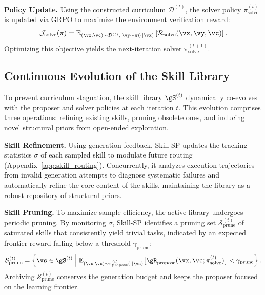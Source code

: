 \textbf{Policy Update.}
Using the constructed curriculum $\mathcal{D}^{(t)}$, the solver policy $\pi_{\text{solve}}^{(t)}$ is updated via GRPO to maximize the environment verification reward:
\begin{equation}
\mathcal{J}_{\text{solve}}(\pi)
=
\mathbb{E}_{
(\vx,\vc)\sim\mathcal{D}^{(t)},\;
\vy\sim\pi(\cdot\mid\vx)
}
\left[
\mathcal{R}_{\text{solve}}(\vx,\vy,\vc)
\right].
\label{eq:solver_rl_objective}
\end{equation}
Optimizing this objective yields the next-iteration solver $\pi_{\text{solve}}^{(t+1)}$.



\subsection{Continuous Evolution of the Skill Library}
\label{sec:skill_evolution}

To prevent curriculum stagnation, the skill library $\gS^{(t)}$ dynamically co-evolves with the proposer and solver policies at each iteration $t$. This evolution comprises three operations: refining existing skills, pruning obsolete ones, and inducing novel structural priors from open-ended exploration.

\textbf{Skill Refinement.}
Using generation feedback, Skill-SP updates the tracking statistics $\sigma$ of each sampled skill to modulate future routing (Appendix~\ref{app:skill_routing}). Concurrently, it analyzes execution trajectories from invalid generation attempts to diagnose systematic failures and automatically refine the core content of the skills, maintaining the library as a robust repository of structural priors.

\textbf{Skill Pruning.}
To maximize sample efficiency, the active library undergoes periodic pruning. By monitoring $\sigma$, Skill-SP identifies a pruning set $\mathcal{S}_{\text{prune}}^{(t)}$ of saturated skills that consistently yield trivial tasks, indicated by an expected frontier reward falling below a threshold $\gamma_{\text{prune}}$:
\begin{equation}
    \mathcal{S}_{\text{prune}}^{(t)} = \left\{ \vs \in \gS^{(t)} \;\middle|\; \mathbb{E}_{(\vx,\vc)\sim\pi_{\text{propose}}^{(t)}(\cdot\mid\vs)} \big[ \gR_{\text{propose}}(\vx,\vc;\pi_{\text{solve}}^{(t)}) \big] < \gamma_{\text{prune}} \right\}.
\end{equation}
Archiving $\mathcal{S}_{\text{prune}}^{(t)}$ conserves the generation budget and keeps the proposer focused on the learning frontier.

